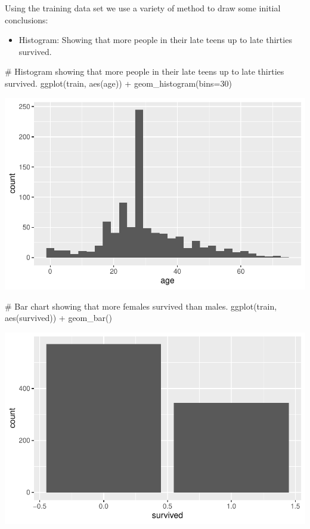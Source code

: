 \documentclass[
  letterpaper,
  DIV=11,
  numbers=noendperiod]{scrartcl}
\newenvironment{Shaded}{\begin{snugshade}}{\end{snugshade}}
\newcommand{\AttributeTok}[1]{\textcolor[rgb]{0.40,0.45,0.13}{#1}}
\newcommand{\CommentTok}[1]{\textcolor[rgb]{0.37,0.37,0.37}{#1}}
\newcommand{\DecValTok}[1]{\textcolor[rgb]{0.68,0.00,0.00}{#1}}
\newcommand{\FunctionTok}[1]{\textcolor[rgb]{0.28,0.35,0.67}{#1}}
\newcommand{\NormalTok}[1]{\textcolor[rgb]{0.00,0.23,0.31}{#1}}
\newcommand{\SpecialCharTok}[1]{\textcolor[rgb]{0.37,0.37,0.37}{#1}}
\providecommand{\tightlist}{%
  \setlength{\itemsep}{0pt}\setlength{\parskip}{0pt}}\usepackage{longtable,booktabs,array}
\begin{document}
Using the training data set we use a variety of method to draw some
initial conclusions:

\begin{itemize}
\tightlist
\item
  Histogram: Showing that more people in their late teens up to late
  thirties survived.
\end{itemize}

\begin{Shaded}
\begin{Highlighting}[]
\CommentTok{\# Histogram showing that more people in their late teens up to late thirties survived.}
\FunctionTok{ggplot}\NormalTok{(train, }\FunctionTok{aes}\NormalTok{(age)) }\SpecialCharTok{+}
  \FunctionTok{geom\_histogram}\NormalTok{(}\AttributeTok{bins=}\DecValTok{30}\NormalTok{)}
\end{Highlighting}
\end{Shaded}

\includegraphics{FinalProject_files/figure-pdf/unnamed-chunk-10-1.pdf}

\begin{Shaded}
\begin{Highlighting}[]
\CommentTok{\# Bar chart showing that more females survived than males.}
\FunctionTok{ggplot}\NormalTok{(train, }\FunctionTok{aes}\NormalTok{(survived)) }\SpecialCharTok{+}
  \FunctionTok{geom\_bar}\NormalTok{()}
\end{Highlighting}
\end{Shaded}

\includegraphics{FinalProject_files/figure-pdf/unnamed-chunk-10-2.pdf}
\end{document}

